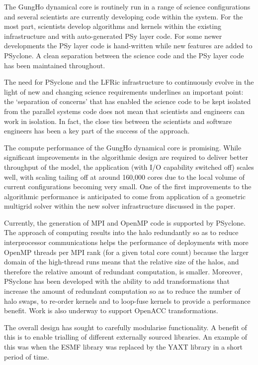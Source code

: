 \documentclass[review,times]{elsarticle}
\begin{document}
The GungHo dynamical core is routinely run in a range of science
configurations and several scientists are currently developing code within
the system. For the most part, scientists develop algorithms and kernels
within the existing infrastructure and with auto-generated PSy layer
code. For some newer developments the PSy layer code is hand-written
while new features are added to PSyclone. A clean separation between
the science code and the PSy layer code has been maintained
throughout. 

The need for PSyclone and the LFRic infrastructure to continuously
evolve in the light of new and changing science requirements
underlines an important point: the `separation of concerns' that has
enabled the science code to be kept isolated from the parallel systems
code does not mean that scientists and engineers can work in
isolation. In fact, the close ties between the scientists and software
engineers has been a key part of the success of the approach.

The compute performance of the GungHo dynamical core is promising. While
significant improvements in the algorithmic design are required to
deliver better throughput of the model, the application (with I/O
capability switched off) scales well, with scaling tailing off at
around 160,000 cores due to the local volume of current configurations
becoming very small. One of the first improvements to the algorithmic
performance is anticipated to come from application of a geometric
multigrid solver within the new solver infrastructure discussed in the paper.

Currently, the generation of MPI and OpenMP code is supported by
PSyclone.  The approach of computing results into the halo redundantly
so as to reduce interprocessor communications helps the performance of
deployments with more OpenMP threads per MPI rank (for a given total
core count) because the larger domain of the high-thread runs means
that the relative size of the halos, and therefore the relative amount
of redundant computation, is smaller.  Moreover, PSyclone has been
developed with the ability to add transformations that increase the
amount of redundant computation so as to reduce the number of halo
swaps, to re-order kernels and to loop-fuse kernels to provide a
performance benefit. Work is also underway to support OpenACC
transformations.

The overall design has sought to carefully modularise functionality. A
benefit of this is to enable trialling of different externally sourced
libraries. An example of this was when the ESMF library was replaced by the
YAXT library in a short period of time.
\end{document}
